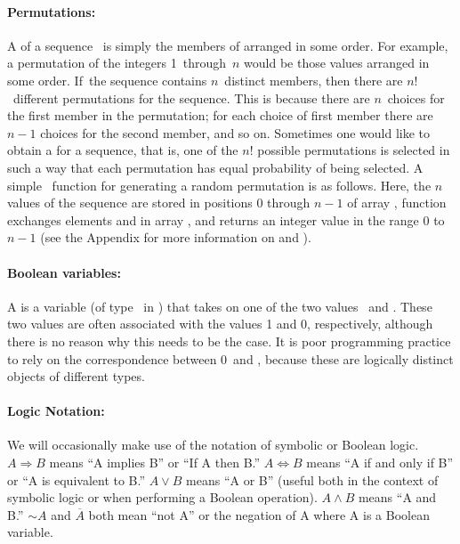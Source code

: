 \paragraph{Permutations:}
A  of a
sequence~
is simply the members of  arranged in some order.
For example, a permutation of the integers 1~through~\(n\) would be
those values arranged in some order.
If~the sequence
contains \(n\)~distinct members, then there are
\(n!\)~different permutations for the sequence.
This is because there are \(n\)~choices for the first member in the
permutation; for each choice of first member there are \(n-1\) choices 
for the second member, and so on.
Sometimes one would like to obtain a  for a
sequence, that is, one of the \(n!\) possible permutations is selected
in such a way that each permutation has equal probability of being
selected.
A simple \Lang\ function for generating a random permutation is as
follows.
Here, the \(n\) values of the sequence are stored in
positions 0 through \(n-1\) of array ,
function 
exchanges elements  and  in array ,
and 
returns an integer value in the range 0 to \(n-1\)
(see the Appendix for more information on  and
).


\paragraph{Boolean variables:}
A 
is a variable (of type \Bool\ in \Lang) that takes on one of the two
values \TRUE\ and \FALSE.
These two values are often associated with the values 1 and 0,
respectively, although there is no reason why this needs to be the case.
It is poor programming practice to rely on the
correspondence between 0~and \FALSE, because these are logically
distinct objects of different types.

\paragraph{Logic Notation:}
We will occasionally make use of the notation of symbolic or Boolean
logic.
\(A \Rightarrow B\) means ``A implies B'' or ``If A then B.''
\(A \Leftrightarrow B\) means ``A if and only if B'' or ``A is
equivalent to B.''
\(A \vee B\) means ``A or B'' (useful both in the context of symbolic
logic or when performing a Boolean operation).
\(A \wedge B\) means ``A and B.''
\(\sim\!A\) and \(\overline{A}\) both mean ``not A'' or the negation
of A where A is a Boolean variable.

